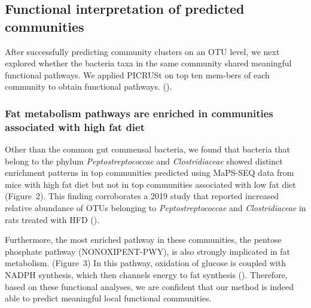 \documentclass{bioinfo}
\begin{document}
\subsection{Functional interpretation of predicted communities}
After successfully predicting community clusters on an OTU level, we next explored whether the bacteria taxa in the same community shared meaningful functional pathways. We applied PICRUSt on top ten mem-bers of each community to obtain functional pathways. (\citealp{Langille2013}).

\subsubsection{Fat metabolism pathways are enriched in communities associated with high fat diet}
Other than the common gut commensal bacteria, we found that bacteria that belong to the phylum \textit{Peptostreptococcae} and \textit{Clostridiaceae} showed distinct enrichment patterns in top communities predicted using MaPS-SEQ data from mice with high fat diet but not in top communities associated with low fat diet (Figure~2\vphantom{\ref{fig:02}}). This finding corroborates a 2019 study that reported increased relative abundance of OTUs belonging to \textit{Peptostreptococcae} and \textit{Clostridiaceae} in rats treated with HFD (\citealp{Liu2019}). 

Furthermore, the most enriched pathway in these communities, the pentose phosphate pathway (NONOXIPENT-PWY), is also strongly implicated in fat metabolism. (Figure~3\vphantom{\ref{fig:03}}) In this pathway, oxidation of glucose is coupled with NADPH synthesis, which then channels energy to fat synthesis (\citealp{Kruger2003}). Therefore, based on these functional analyses, we are confident that our method is indeed able to predict meaningful local functional communities. 
\end{document}

